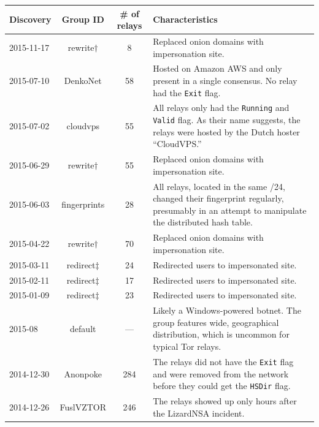 \begin{table}[t]
\centering
\begin{tabular}{l c c p{10cm}}
\textbf{Discovery} & \textbf{Group ID} & \textbf{\# of relays} & \textbf{Characteristics} \\
\hline
2015-11-17 & rewrite$\dagger$ & 8 & Replaced onion domains with impersonation site. \\

2015-07-10 & DenkoNet & 58 & Hosted on Amazon AWS and only present in a single
consensus.  No relay had the \texttt{Exit} flag. \\

2015-07-02 & cloudvps & 55 & All relays only had the \texttt{Running} and
\texttt{Valid} flag.  As their name suggests, the relays were hosted by
the Dutch hoster ``CloudVPS.'' \\

2015-06-29 & rewrite$\dagger$ & 55 & Replaced onion domains with impersonation site. \\


2015-06-03 & fingerprints & 28 & All relays, located in the same /24, changed
their fingerprint regularly, presumably in an attempt to manipulate the
distributed hash table. \\

2015-04-22 & rewrite$\dagger$ & 70 & Replaced onion domains with impersonation site. \\

2015-03-11 & redirect$\ddagger$ & 24 & Redirected users to impersonated site. \\
2015-02-11 & redirect$\ddagger$ & 17 & Redirected users to impersonated site. \\
2015-01-09 & redirect$\ddagger$ & 23 & Redirected users to impersonated site. \\

2015-08 & default & --- & Likely a Windows-powered botnet.  The group
features wide, geographical distribution, which is uncommon for typical Tor
relays. \\

2014-12-30 & Anonpoke & 284 & The relays did not have the \texttt{Exit} flag and
were removed from the network before they could get the \texttt{HSDir} flag. \\

2014-12-26 & FuslVZTOR & 246 & The relays showed up only hours after the
LizardNSA incident. \\


\end{tabular}
\end{table}
